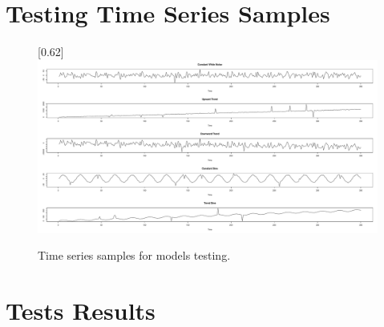 \chapter{Testing Time Series Samples} \label{appen:testing-samples}
    \begin{figure}[H]
        \begin{center}
            \scalebox{0.22}[0.62]{\includegraphics[angle=0]{img/testing-time-series.pdf}}
            \caption{Time series samples for models testing.}
            \label{appen:img-testing-samples}
        \end{center}
    \end{figure}

\chapter{Tests Results} \label{appen:chap:results}

